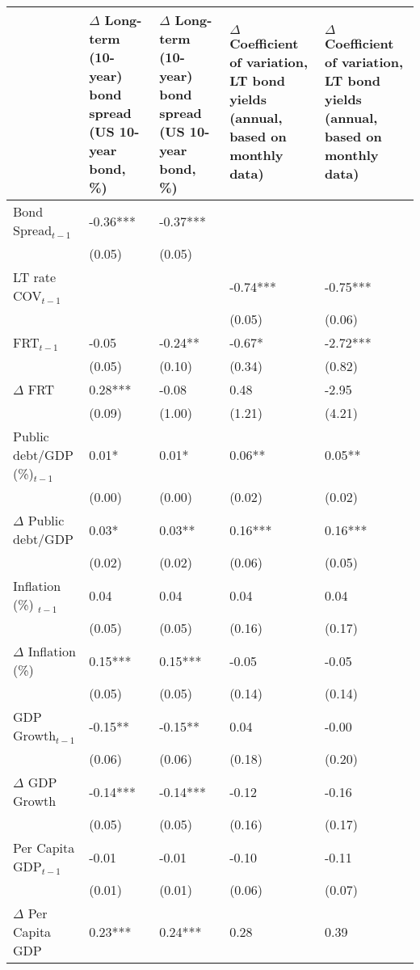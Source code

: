 \begingroup\tiny
\begin{tabular}{lp{3cm}p{3cm}p{3cm}p{3cm}}
  \hline
 & $\Delta$ Long-term (10-year) bond spread (US 10-year bond, \%) & $\Delta$ Long-term (10-year) bond spread (US 10-year bond, \%) & $\Delta$ Coefficient of variation, LT bond yields (annual, based on monthly data) & $\Delta$ Coefficient of variation, LT bond yields (annual, based on monthly data) \\ 
  \hline
Bond Spread$_{t-1}$ & -0.36*** & -0.37*** &  &  \\ 
   & (0.05) & (0.05) &  &  \\ 
  LT rate COV$_{t-1}$ &  &  & -0.74*** & -0.75*** \\ 
   &  &  & (0.05) & (0.06) \\ 
  FRT$_{t-1}$ & -0.05 & -0.24** & -0.67* & -2.72*** \\ 
   & (0.05) & (0.10) & (0.34) & (0.82) \\ 
  $\Delta$ FRT & 0.28*** & -0.08 & 0.48 & -2.95 \\ 
   & (0.09) & (1.00) & (1.21) & (4.21) \\ 
  Public debt/GDP (\%)$_{t-1}$ & 0.01* & 0.01* & 0.06** & 0.05** \\ 
   & (0.00) & (0.00) & (0.02) & (0.02) \\ 
  $\Delta$ Public debt/GDP & 0.03* & 0.03** & 0.16*** & 0.16*** \\ 
   & (0.02) & (0.02) & (0.06) & (0.05) \\ 
  Inflation (\%) $_{t-1}$ & 0.04 & 0.04 & 0.04 & 0.04 \\ 
   & (0.05) & (0.05) & (0.16) & (0.17) \\ 
  $\Delta$ Inflation (\%) & 0.15*** & 0.15*** & -0.05 & -0.05 \\ 
   & (0.05) & (0.05) & (0.14) & (0.14) \\ 
  GDP Growth$_{t-1}$ & -0.15** & -0.15** & 0.04 & -0.00 \\ 
   & (0.06) & (0.06) & (0.18) & (0.20) \\ 
  $\Delta$ GDP Growth & -0.14*** & -0.14*** & -0.12 & -0.16 \\ 
   & (0.05) & (0.05) & (0.16) & (0.17) \\ 
  Per Capita GDP$_{t-1}$ & -0.01 & -0.01 & -0.10 & -0.11 \\ 
   & (0.01) & (0.01) & (0.06) & (0.07) \\ 
  $\Delta$ Per Capita GDP & 0.23*** & 0.24*** & 0.28 & 0.39 \\ 

\end{tabular}
